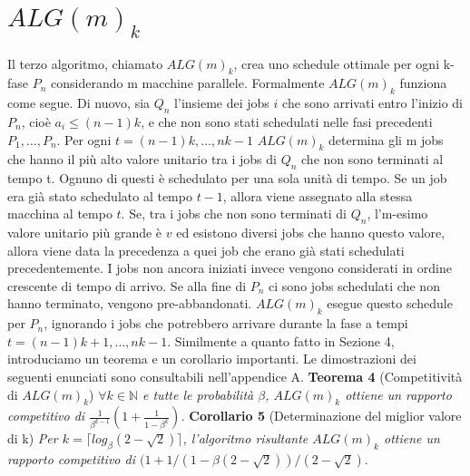 \documentclass[12pt]{article}
\newcommand*{\N}{\mathbb{N}}
\begin{document}
\section{$ALG(m)_{k}$}
Il terzo algoritmo, chiamato $ALG(m)_{k}$, crea uno schedule ottimale per ogni k-fase $P_{n}$ considerando m macchine parallele. Formalmente $ALG(m)_{k}$ funziona come segue. Di nuovo, sia $Q_{n}$ l’insieme dei jobs $i$ che sono arrivati entro l’inizio di $P_{n}$, cioè $a_{i} \leq (n - 1)k$, e che non sono stati schedulati nelle fasi precedenti $P_{1}, … , P_{n}$. Per ogni $t = (n-1)k, … , nk - 1$ $ALG(m)_{k}$ determina gli m jobs che hanno il più alto valore unitario tra i jobs di $Q_{n}$ che non sono terminati al tempo t. Ognuno di questi è schedulato per una sola unità di tempo. Se un job era già stato schedulato al tempo $t-1$, allora viene assegnato alla stessa macchina al tempo $t$. Se, tra i jobs che non sono terminati di $Q_{n}$, l’m-esimo valore unitario più grande è $v$ ed esistono diversi jobs che hanno questo valore, allora viene data la precedenza a quei job che erano già stati schedulati precedentemente. I jobs non ancora iniziati invece vengono considerati in ordine crescente di tempo di arrivo. Se alla fine di $P_{n}$ ci sono jobs schedulati che non hanno terminato, vengono pre-abbandonati. $ALG(m)_{k}$ esegue questo schedule per $P_{n}$, ignorando i jobs che potrebbero arrivare durante la fase a tempi $t = (n-1)k + 1, …, nk - 1$.
Similmente a quanto fatto in Sezione 4, introduciamo un teorema e un corollario importanti. Le dimostrazioni dei seguenti enunciati sono consultabili nell'appendice A.
\newline \newline
\textbf{Teorema 4} (Competitività di $ALG(m)_{k}$)
\textit{$\forall k \in \N$ e tutte le probabilità $\beta$, $ALG(m)_{k}$ ottiene un rapporto competitivo di $\frac{1}{\beta^{k-1}}(1 + \frac{1}{1-\beta^{k}})$.}
\newline \newline
\textbf{Corollario 5} (Determinazione del miglior valore di k)
\textit{Per $k = \lceil log_{\beta} (2 - \sqrt{2})\rceil$, l'algoritmo risultante $ALG(m)_{k}$ ottiene un rapporto competitivo di $(1 + 1 / (1 - \beta (2 - \sqrt{2})) / (2 - \sqrt{2}).$}
\end{document}
